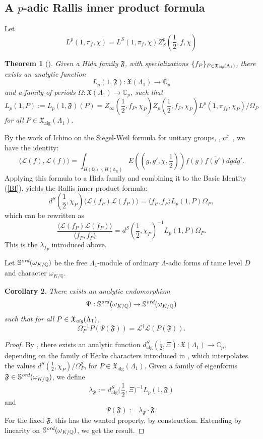 \documentclass[12pt,a4paper,reqno]{amsart}
\theoremstyle{definition}
\numberwithin{definition}{subsection}
\theoremstyle{definition}
\numberwithin{Definition}{subsection}
\theoremstyle{remark}
\theoremstyle{remark}
\numberwithin{Remark}{subsection}
\theoremstyle{remark}
\theoremstyle{plain}
\newtheorem{Theorem}{Theorem}
\numberwithin{Theorem}{subsection}
\theoremstyle{plain}
\theoremstyle{plain}
\theoremstyle{plain}
\newtheorem{Corollary}[Theorem]{Corollary}
\theoremstyle{plain}
\theoremstyle{plain}
\theoremstyle{plain}
\theoremstyle{plain}
\newcommand*{\Q}{\mathbb{Q}}
\newcommand*{\Cc}{\mathbb{C}}
\newcommand*{\s}{\mathbb{S}}
\newcommand*{\A}{\mathbb{A}}
\begin{document}
\subsection{A $p$-adic Rallis inner product formula}
\noindent Let 
\[
L^p(1,\pi_f,\chi)=L^S(1,\pi_f,\chi)Z^p_S(\frac{1}{2},f,\chi)
\]
\begin{Theorem}[]
Given a Hida family $\mathfrak{F}$, with specializations $\{f_P\}_{P\in \mathfrak{X}_{\emph{alg}}(\Lambda_1)}$, there exists an analytic function 
\[
L_p(1,\mathfrak{F}):\mathfrak{X}(\Lambda_1)\to \Cc_p
\]
and a family of periods $\Omega:\mathfrak{X}(\Lambda_1)\to\Cc_p$, such that
\[
L_p(1,P):=L_p(1,\mathfrak{F})(P)=Z_\infty(\frac{1}{2},f_P,\chi_P)Z_p(\frac{1}{2},f_P,\chi_P)L^p(1,\pi_{f_P},\chi_P)/\Omega_P
\]
for all $P\in \mathfrak{X}_{\text{alg}}(\Lambda_1)$.
\end{Theorem}
\noindent By the work of Ichino on the Siegel-Weil formula for unitary groups, \cite{ichino}, cf. \cite[p. 246]{harris}, we have the identity:
\[
\langle\mathcal{L}(f),\mathcal{L}(f)\rangle=\int_{H(\Q)\backslash H(\A_\Q)} E((g,g',\chi,\frac{1}{2}))f(g)\overline{f(g')}dgdg'.
\]
Applying this formula to a Hida family and combining it to the Basic Identity (\ref{BI}), yields the Rallis inner product formula:
\[
d^S(\frac{1}{2},\chi_P)\langle\mathcal{L}(f_P)\mathcal{L}(f_P)\rangle=\langle f_P, f_P\rangle L_p(1,P)\Omega_P,
\]
which can be rewritten as
\[
\frac{\langle\mathcal{L}(f_P)\mathcal{L}(f_P)\rangle}{\langle f_P, f_P\rangle}=d^S(\frac{1}{2},\chi_P)^{-1}L_p(1,P)\Omega_P.
\]
This is the $\lambda_{f_P}$ introduced above.

Let $\s^{\emph{ord}}(\omega_{K/\Q})$ be the free $\Lambda_1$-module of ordinary $\Lambda$-adic forms of tame level $D$ and character $\omega_{K/\Q}$.
\begin{Corollary}
\label{main1}
There exists an analytic endomorphism 
\[
\Psi:\s^{\emph{ord}}(\omega_{K/\Q})\to \s^{\emph{ord}}(\omega_{K/\Q})
\] 
such that for all $P\in \mathfrak{X}_{\emph{alg}}(\Lambda_1)$,
\[
\Omega_P^{-1} P(\Psi(\mathfrak{F}))=\mathcal{L}^\dagger\mathcal{L}(P(\mathfrak{F})).
\]
\end{Corollary}

\begin{proof}
By \cite[Proposition 6.5]{harris}, there exists an analytic function $d^S_{\text{alg}}(\frac{1}{2},\Xi):\mathfrak{X}(\Lambda_1)\to \Cc_p$, depending on the family of Hecke characters introduced in \cite[Lemma 16]{iudica}, which interpolates the values $d^S(\frac{1}{2},\chi_P)/\Omega_P^2$, for $P\in \mathfrak{X}_{\text{alg}}(\Lambda_1)$. Given a family of eigenforms $\mathfrak{F}\in \s^{\emph{ord}}(\omega_{K/\Q})$, we define 
\[
\lambda_{\mathfrak{F}}:=d^S_{\text{alg}}\Big(\frac{1}{2},\Xi\Big)^{-1} L_p(1,\mathfrak{F})
\]
and
\[
\Psi(\mathfrak{F}):=\lambda_{\mathfrak{F}}\cdot \mathfrak{F}.
\]
For the fixed $\mathfrak{F}$, this has the wanted property, by construction.
Extending by linearity on $\s^{\emph{ord}}(\omega_{K/\Q})$, we get the result.
\end{proof}
\end{document}
